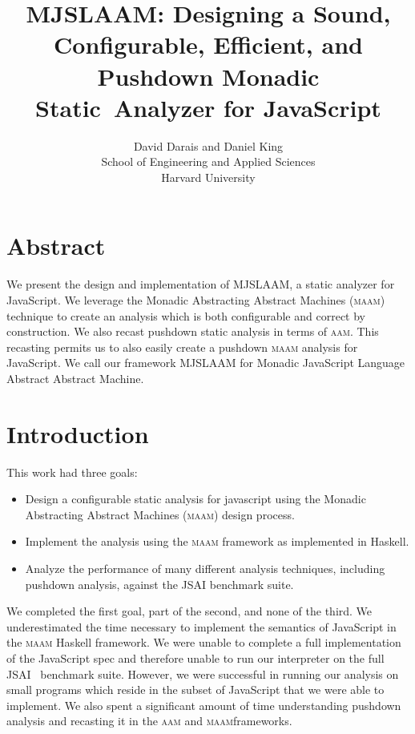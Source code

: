 \documentclass[10pt,letter,english]{article}
\newcommand{\aam}[0]{\textsc{aam}}
\newcommand{\maam}[0]{\textsc{maam}}
\newcommand{\js}[0]{JavaScript}
\begin{document}
\title{MJSLAAM: Designing a Sound, Configurable, Efficient, and Pushdown %
              Monadic Static~Analyzer for JavaScript}
\author{{David Darais and Daniel King}\\
        School of Engineering and Applied Sciences\\
        Harvard University}

\maketitle

\section*{Abstract}

We present the design and implementation of MJSLAAM, a static analyzer for \js{}. We
leverage the Monadic Abstracting Abstract Machines (\maam{}) technique to
create an analysis which is both configurable and correct by construction. We
also recast pushdown static analysis in terms of \aam{}. This recasting permits
us to also easily create a pushdown \maam{} analysis for \js{}.
We call our framework MJSLAAM for Monadic JavaScript Language Abstract Abstract
Machine.

\section{Introduction}

This work had three goals:

\begin{itemize}
\item Design a configurable static analysis for javascript using the
  Monadic Abstracting Abstract Machines (\maam{}) \cite{maam} design process.
\item Implement the analysis using the \maam{} framework as implemented in Haskell.
\item Analyze the performance of many different analysis techniques, including
  pushdown analysis, against the JSAI \cite{jsai} benchmark suite.
\end{itemize}

We completed the first goal, part of the second, and none of the third.
%
We underestimated the time necessary to implement the semantics of \js{} in the
\maam{} Haskell framework.
%
We were unable to complete a full implementation of the \js{} spec and
therefore unable to run our interpreter on the full JSAI~\cite{jsai} benchmark
suite.
%
However, we were successful in running our analysis on small programs which
reside in the subset of \js{} that we were able to implement.
%
We also spent a significant amount of time understanding pushdown analysis and
recasting it in the \aam{} and \maam frameworks.
\end{document}
